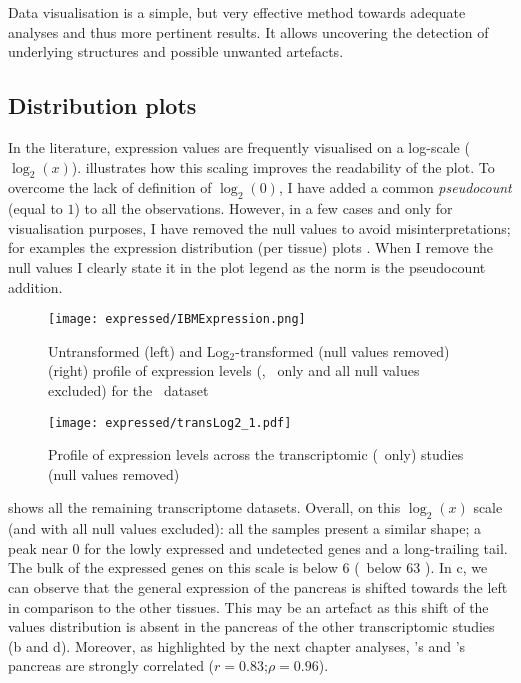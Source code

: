 Data visualisation is a simple, but very effective method
towards adequate analyses and thus more pertinent results.
It allows uncovering the detection of underlying structures
and possible unwanted artefacts.\mybr\

\subsection{Distribution plots}\label{subsec:distribPlot}
\vspace{-0.2in}
In the literature, expression values are frequently
visualised on a log-scale ($\log_{2}(x)$).
 illustrates how
this scaling improves the readability of the plot.
To overcome the lack of definition of $\log_{2}(0)$,
I have added a common \emph{pseudocount} (equal to $1$)
to all the observations.
However, in a few cases and only for visualisation purposes,
I have removed the null values to avoid misinterpretations;
for examples the expression distribution (per tissue) plots
.
When I remove the null values I clearly state it in the plot legend
as the norm is the pseudocount addition.\mybr\

\begin{figure}[!htbp]
    \centering
    \texttt{[image: expressed/IBMExpression.png]}
    \caption{Untransformed (left) and Log$_{2}$-transformed (null values removed)
    (right) profile of expression levels (\FPKM, \pcgs\ only and all null values excluded)
    for the \ibm\ dataset}\label{fig:distribPlot}
\end{figure}

\begin{figure}[!htbp]
    \centering
    \texttt{[image: expressed/transLog2\_1.pdf]}
    \caption{Profile of expression levels across the transcriptomic (\pcgs\ only)
    studies (null values removed)
    }\label{fig:distribTrans}
\end{figure}

 shows all the remaining transcriptome datasets.
Overall,
on this $\log_{2}(x)$ scale (and with all null values excluded):
all the samples present a similar shape;
a peak near $0$ for the lowly expressed and undetected genes and a long-trailing tail.
The bulk of the expressed genes on this scale is below $6$ (\ie\ below 63 \FPKM).
In c, we can observe that the general expression
of the pancreas is shifted towards the left in comparison to the other tissues.
This may be an artefact as this shift of the values distribution
is absent in the pancreas of the other transcriptomic studies
(b and d).
Moreover, as highlighted by the next chapter analyses,
\uhlen's and  \gtex's pancreas are strongly
correlated ($r = 0.83$;$\rho = 0.96$).\mybr\

